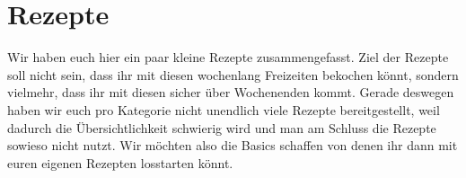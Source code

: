 \chapter{Rezepte}\label{ch:rezepte}
Wir haben euch hier ein paar kleine Rezepte zusammengefasst.
Ziel der Rezepte soll nicht sein, dass ihr mit diesen wochenlang Freizeiten bekochen könnt, sondern vielmehr, dass ihr mit diesen sicher über Wochenenden kommt.
Gerade deswegen haben wir euch pro Kategorie nicht unendlich viele Rezepte bereitgestellt, weil dadurch die Übersichtlichkeit schwierig wird und man am Schluss die Rezepte sowieso nicht nutzt.
Wir möchten also die Basics schaffen von denen ihr dann mit euren eigenen Rezepten losstarten könnt.






